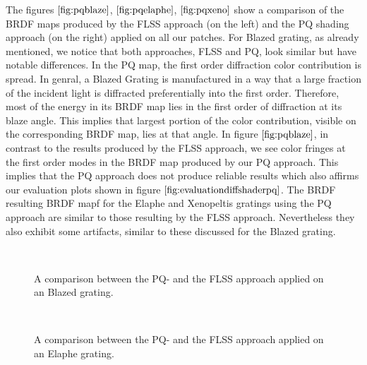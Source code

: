 The figures $\ref{fig:pqblaze}$, $\ref{fig:pqelaphe}$, $\ref{fig:pqxeno}$ show a comparison of the BRDF maps produced by the FLSS approach (on the left) and the PQ shading approach (on the right) applied on all our patches. For Blazed grating, as already mentioned, we notice that both approaches, FLSS and PQ, look similar but have notable differences. In the PQ map, the first order diffraction color contribution is spread. In genral, a Blazed Grating is manufactured in a way that a large fraction of the incident light is diffracted preferentially into the first order. Therefore, most of the energy in its BRDF map lies in the first order of diffraction at its blaze angle. This implies that largest portion of the color contribution, visible on the corresponding BRDF map, lies at that angle. In figure $\ref{fig:pqblaze}$, in contrast to the results produced by the FLSS approach, we see color fringes at the first order modes in the BRDF map produced by our PQ approach. This implies that the PQ approach does not produce reliable results which also affirms our evaluation plots shown in figure $\ref{fig:evaluationdiffshaderpq}$. The BRDF resulting BRDF mapf for the Elaphe and Xenopeltis gratings using the PQ approach are similar to those resulting by the FLSS approach. Nevertheless they also exhibit some artifacts, similar to these discussed for the Blazed grating.

\begin{figure}[H]
  \centering
~
\caption[BRDF Map: PQ vs FLSS Approach on Blazed Grating]{A comparison between the PQ- and the FLSS approach applied on an Blazed grating.}
\label{fig:pqblaze}
\end{figure}

\begin{figure}[H]
  \centering
~

\caption[BRDF Map: PQ vs FLSS Approach on Elaphe Grating]{A comparison between the PQ- and the FLSS approach applied on an Elaphe grating.}
\label{fig:pqelaphe}
\end{figure}


